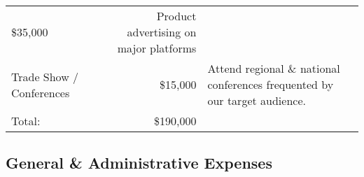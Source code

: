 \documentclass[10pt,openany]{book}
\begin{document}
\begin{longtable}[]{@{}lrl@{}}
\begin{minipage}[t]{0.11\columnwidth}
\$35,000\strut
\end{minipage} & \begin{minipage}[t]{0.48\columnwidth}\raggedright
Product advertising on major platforms\strut
\end{minipage}\tabularnewline
\begin{minipage}[t]{0.32\columnwidth}\raggedright
Trade Show / Conferences\strut
\end{minipage} & \begin{minipage}[t]{0.11\columnwidth}\raggedleft
\$15,000\strut
\end{minipage} & \begin{minipage}[t]{0.48\columnwidth}\raggedright
Attend regional \& national conferences frequented by our target
audience.\strut
\end{minipage}\tabularnewline
\begin{minipage}[t]{0.32\columnwidth}\raggedright
Total:\strut
\end{minipage} & \begin{minipage}[t]{0.11\columnwidth}\raggedleft
\$190,000\strut
\end{minipage} & \begin{minipage}[t]{0.48\columnwidth}\raggedright
\strut
\end{minipage}\tabularnewline
\bottomrule
\end{longtable}

\hypertarget{general-administrative-expenses}{%
\subsection{General \& Administrative
Expenses}\label{general-administrative-expenses}}
\end{document}
